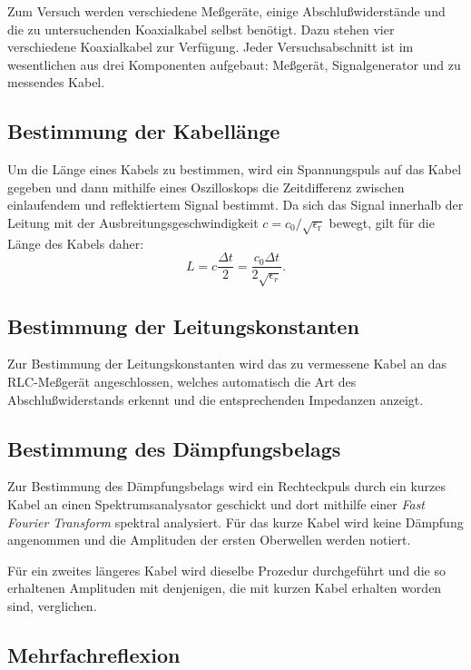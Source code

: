 Zum Versuch werden verschiedene Meßgeräte, einige Abschlußwiderstände
und die zu untersuchenden Koaxialkabel selbst benötigt.  Dazu stehen
vier verschiedene Koaxialkabel zur Verfügung.  Jeder Versuchsabschnitt
ist im wesentlichen aus drei Komponenten aufgebaut: Meßgerät,
Signalgenerator und zu messendes Kabel.

\subsection{Bestimmung der Kabellänge}

Um die Länge eines Kabels zu bestimmen, wird ein Spannungspuls auf das
Kabel gegeben und dann mithilfe eines Oszilloskops die Zeitdifferenz
zwischen einlaufendem und reflektiertem Signal bestimmt.  Da sich das
Signal innerhalb der Leitung mit der Ausbreitungsgeschwindigkeit $c =
c_0/\sqrt{\epsilon_\text{r}}$ bewegt, gilt für die Länge des Kabels
daher:
%
\begin{equation}
\label{eq:laenge}
L = c \frac{\Delta t}{2} = \frac{c_0 \Delta t}{2 \sqrt{\epsilon_r}}.
\end{equation}

\subsection{Bestimmung der Leitungskonstanten}

Zur Bestimmung der Leitungskonstanten wird das zu vermessene Kabel an
das RLC-Meßgerät angeschlossen, welches automatisch die Art des
Abschlußwiderstands erkennt und die entsprechenden Impedanzen anzeigt.

\subsection{Bestimmung des Dämpfungsbelags}

Zur Bestimmung des Dämpfungsbelags wird ein Rechteckpuls durch
ein kurzes Kabel an einen Spektrumsanalysator geschickt und dort
mithilfe einer \textit{Fast Fourier Transform} spektral
analysiert.  Für das kurze Kabel wird keine Dämpfung angenommen
und die Amplituden der ersten Oberwellen werden notiert.

Für ein zweites längeres Kabel wird dieselbe Prozedur durchgeführt und
die so erhaltenen Amplituden mit denjenigen, die mit kurzen Kabel
erhalten worden sind, verglichen.

\subsection{Mehrfachreflexion}
\label{sec:durchfuehrung-mehrfachreflexion}

